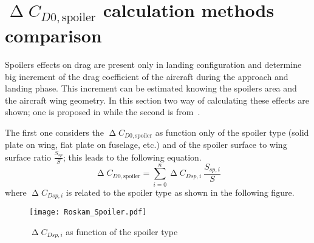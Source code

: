 \section{$\upDelta C_{D0,\text{spoiler}}$ calculation methods comparison}\label{par:DeltaCD0SpoilerComparison}
Spoilers effects on drag are present only in landing configuration and determine big increment of the drag coefficient of the aircraft during the approach and landing phase. This increment can be estimated knowing the spoilers area and the aircraft wing geometry. In this section two way of calculating these effects are shown; one is proposed in \cite{roskamAirplane} while the second is from~\cite{Lausetti:decollo}.

\bigskip
\noindent
The first one considers the $\upDelta C_{D0,\text{spoiler}}$ as function only of the spoiler type (solid plate on wing, flat plate on fuselage, etc.) and of the spoiler surface to wing surface ratio $\frac{S_{sp}}{S}$; this leads to the following equation.
%
\begin{equation}
\upDelta C_{D0,\text{spoiler}}=\sum_{i=0}^n \upDelta C_{Dsp,i}\ \dfrac{S_{sp,i}}{S}
\label{eqn:RoskamSpoiler}
\end{equation}
%
\noindent
where $\upDelta C_{Dsp,i}$ is related to the spoiler type as shown in the following figure.
%
\begin{figure}[H]
\centering
\texttt{[image: Roskam\_Spoiler.pdf]}
\caption{$\upDelta C_{Dsp,i}$ as function of the spoiler type}
\label{fig:SpoilerType}
\end{figure}

